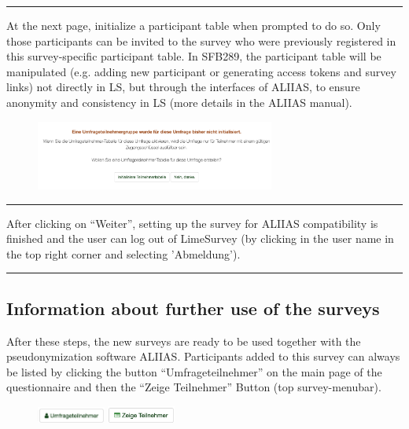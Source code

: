 \par\noindent\rule{\textwidth\color{pniblue}}{0.4pt}
At the next page, initialize a participant table when prompted to do so. Only those participants can be invited to the survey who were previously registered in this survey-specific participant table. In SFB289, the participant table will be manipulated (e.g. adding new participant or generating access tokens and survey links) not directly in LS, but through the interfaces of ALIIAS, to ensure anonymity and consistency in LS (more details in the ALIIAS manual).

\begin{figure}[H]
\includegraphics[width=0.7\textwidth]{docs/fig/ls_sop4.2.png}
\end{figure}

\par\noindent\rule{\textwidth\color{pniblue}}{0.4pt}
After clicking on “Weiter”, setting up the survey for ALIIAS compatibility is finished and the user can log out of LimeSurvey (by clicking in the user name in the top right corner and selecting 'Abmeldung').

\par\noindent\rule{\textwidth\color{pniblue}}{0.4pt}
\subsection*{Information about further use of the surveys}
After these steps, the new surveys are ready to be used together with the pseudonymization software ALIIAS. Participants added to this survey can always be listed by clicking the button “Umfrageteilnehmer” on the main page of the questionnaire and then the “Zeige Teilnehmer” Button (top survey-menubar). 

\begin{figure}[H]
\includegraphics[width=0.2\textwidth]{docs/fig/ls_sop4_umfrageteilnehmer.png}
\includegraphics[width=0.2\textwidth]{docs/fig/ls_sop4_zeige_teilnehmer.png}
\end{figure}

